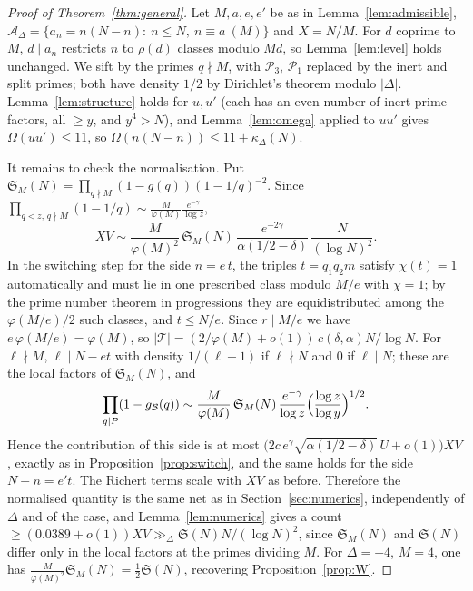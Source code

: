\documentclass[11pt]{amsart}
\theoremstyle{remark}
\newcommand{\cA}{\mathcal{A}}
\newcommand{\cB}{\mathcal{B}}
\newcommand{\cP}{\mathcal{P}}
\newcommand{\cT}{\mathcal{T}}
\newcommand{\Sg}{\mathfrak{S}}
\begin{document}
\begin{proof}[Proof of Theorem~\ref{thm:general}]
Let $M,a,e,e'$ be as in Lemma~\ref{lem:admissible}, $\cA_\Delta=\{a_n=n(N-n):\ n\le N,\ n\equiv a\ (M)\}$ and
$X=N/M$. For $d$ coprime to $M$, $d\mid a_n$ restricts $n$ to $\rho(d)$ classes modulo $Md$, so
Lemma~\ref{lem:level} holds unchanged. We sift by the primes $q\nmid M$, with $\cP_3$, $\cP_1$ replaced by the
inert and split primes; both have density $1/2$ by Dirichlet's theorem modulo $|\Delta|$. Lemma~\ref{lem:structure}
holds for $u,u'$ (each has an even number of inert prime factors, all $\ge y$, and $y^4>N$), and
Lemma~\ref{lem:omega} applied to $uu'$ gives $\Omega(uu')\le11$, so $\Omega(n(N-n))\le 11+\kappa_\Delta(N)$.

It remains to check the normalisation. Put $\Sg_M(N)=\prod_{q\nmid M}(1-g(q))(1-1/q)^{-2}$. Since
$\prod_{q<z,\,q\nmid M}(1-1/q)\sim\frac{M}{\varphi(M)}\frac{e^{-\gamma}}{\log z}$,
\[
XV\sim\frac{M}{\varphi(M)^2}\,\Sg_M(N)\,\frac{e^{-2\gamma}}{\alpha(1/2-\delta)}\,\frac{N}{(\log N)^2}.
\]
In the switching step for the side $n=e\,t$, the triples $t=q_1q_2m$ satisfy $\chi(t)=1$ automatically and must
lie in one prescribed class modulo $M/e$ with $\chi=1$; by the prime number theorem in progressions they are
equidistributed among the $\varphi(M/e)/2$ such classes, and $t\le N/e$. Since $r\mid M/e$ we have
$e\,\varphi(M/e)=\varphi(M)$, so $|\cT|=(2/\varphi(M)+o(1))\,c(\delta,\alpha)N/\log N$. For $\ell\nmid M$, $\ell\mid N-et$
with density $1/(\ell-1)$ if $\ell\nmid N$ and $0$ if $\ell\mid N$; these are the local factors of $\Sg_M(N)$, and
\[
\prod_{q\mid P}(1-g_\cB(q))\sim\frac{M}{\varphi(M)}\,\Sg_M(N)\,\frac{e^{-\gamma}}{\log z}
\Bigl(\frac{\log z}{\log y}\Bigr)^{1/2}.
\]
Hence the contribution of this side is at most
$\bigl(2c\,e^{\gamma}\sqrt{\alpha(1/2-\delta)}\,U+o(1)\bigr)XV$, exactly as in Proposition~\ref{prop:switch},
and the same holds for the side $N-n=e't$. The Richert terms scale with $XV$ as before. Therefore the
normalised quantity is the same $\mathrm{net}$ as in Section~\ref{sec:numerics}, independently of $\Delta$ and
of the case, and Lemma~\ref{lem:numerics} gives a count $\ge(0.0389+o(1))XV\gg_\Delta\Sg(N)N/(\log N)^2$,
since $\Sg_M(N)$ and $\Sg(N)$ differ only in the local factors at the primes dividing $M$. For $\Delta=-4$,
$M=4$, one has $\frac{M}{\varphi(M)^2}\Sg_M(N)=\frac12\Sg(N)$, recovering Proposition~\ref{prop:W}.
\end{proof}



\enlargethispage{3\baselineskip}
\end{document}

